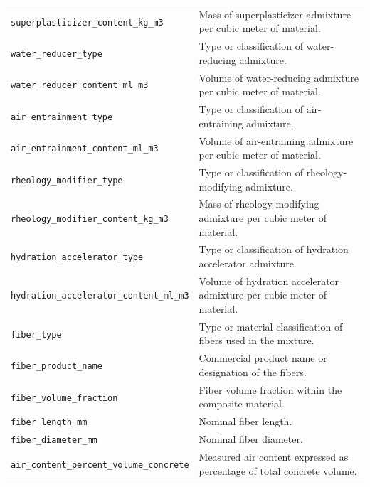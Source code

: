 \documentclass[11pt]{book}
\begin{document}
{\begin{longtable}{p{}p{}}
\texttt{superplasticizer\_content\_kg\_m3} &
Mass of superplasticizer admixture per cubic meter of material. \\

\texttt{water\_reducer\_type} &
Type or classification of water-reducing admixture. \\

\texttt{water\_reducer\_content\_ml\_m3} &
Volume of water-reducing admixture per cubic meter of material. \\

\texttt{air\_entrainment\_type} &
Type or classification of air-entraining admixture. \\

\texttt{air\_entrainment\_content\_ml\_m3} &
Volume of air-entraining admixture per cubic meter of material. \\

\texttt{rheology\_modifier\_type} &
Type or classification of rheology-modifying admixture. \\

\texttt{rheology\_modifier\_content\_kg\_m3} &
Mass of rheology-modifying admixture per cubic meter of material. \\

\texttt{hydration\_accelerator\_type} &
Type or classification of hydration accelerator admixture. \\

\texttt{hydration\_accelerator\_content\_ml\_m3} &
Volume of hydration accelerator admixture per cubic meter of material. \\

\texttt{fiber\_type} &
Type or material classification of fibers used in the mixture. \\

\texttt{fiber\_product\_name} &
Commercial product name or designation of the fibers. \\

\texttt{fiber\_volume\_fraction} &
Fiber volume fraction within the composite material. \\

\texttt{fiber\_length\_mm} &
Nominal fiber length. \\

\texttt{fiber\_diameter\_mm} &
Nominal fiber diameter. \\

\texttt{air\_content\_percent\_volume\_concrete} &
Measured air content expressed as percentage of total concrete volume. \\


\end{longtable}}
\end{document}
